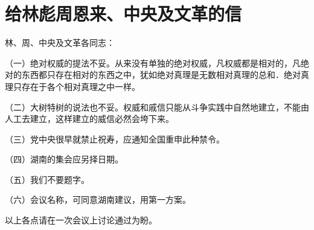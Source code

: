 \section[给林彪周恩来、中央及文革的信（一九六七年十二月十七日）]{给林彪周恩来、中央及文革的信}


林、周、中央及文革各同志：

（一）绝对权威的提法不妥。从来没有单独的绝对权威，凡权威都是相对的，凡绝对的东西都只存在相对的东西之中，犹如绝对真理是无数相对真理的总和．绝对真理只存在于各个相对真理之中一样。

（二）大树特树的说法也不妥。权威和戚信只能从斗争实践中自然地建立，不能由人工去建立，这样建立的威信必然会垮下来。

（三）党中央很早就禁止祝寿，应通知全国重申此种禁令。

（四）湖南的集会应另择日期。

（五）我们不要题字。

（六）会议名称，可同意湖南建议，用第一方案。

以上各点请在一次会议上讨论通过为盼。


